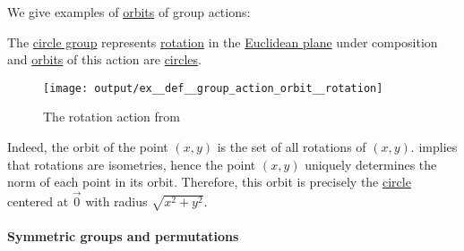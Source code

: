 \begin{example}\label{ex:def:group_action_orbit}
  We give examples of \hyperref[def:group_action_orbit]{orbits} of group actions:
  \begin{thmenum}
     The \hyperref[def:circle_group]{circle group} represents \hyperref[def:rigid_motion/rotation]{rotation} in the \hyperref[def:euclidean_plane]{Euclidean plane} under composition and \hyperref[def:group_action_orbit]{orbits} of this action are \hyperref[def:circle]{circles}.

    \begin{figure}
      \centering
      \texttt{[image: output/ex\_\_def\_\_group\_action\_orbit\_\_rotation]}
      \caption{The rotation action from }
      \label{fig:ex:def:group_action_orbit/rotation}
    \end{figure}

    Indeed, the orbit of the point \( (x, y) \) is the set of all rotations of \( (x, y) \).  implies that rotations are isometries, hence the point \( (x, y) \) uniquely determines the norm of each point in its orbit. Therefore, this orbit is precisely the \hyperref[def:circle]{circle} centered at \( \vec 0 \) with radius \( \sqrt{x^2 + y^2} \).
  \end{thmenum}
\end{example}

\paragraph{Symmetric groups and permutations}

